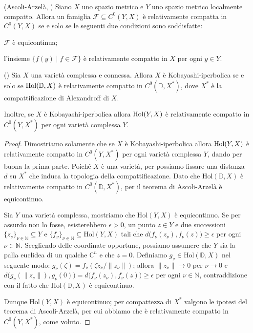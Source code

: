 \begin{thm}
    (Ascoli-Arzelà, \cite[Chapter 7, Theorem 17]{Ke}) Siano $X$ uno spazio metrico e $Y$ uno spazio metrico localmente compatto. Allora un famiglia $\mathcal{F}\subseteq C^0(Y,X)$ è relativamente compatta in $C^0(Y,X)$ se e solo se le seguenti due condizioni sono soddisfatte:
    \begin{nlist}
        \item $\mathcal{F}$ è equicontinua;
        \item l'insieme $\{f(y)\mid f\in\mathcal{F}\}$ è relativamente compatto in $X$ per ogni $y\in Y$.
    \end{nlist}
\end{thm}

\begin{prop} \label{alex}
    (\cite[Theorem 1.3]{A3}) Sia $X$ una varietà complessa e connessa. Allora $X$ è Kobayashi-iperbolica se e solo se $\textnormal{Hol}(\mathbb{D},X)$ è relativamente compatto in $C^0(\mathbb{D},X^*)$, dove $X^*$ è la compattificazione di Alexandroff di $X$.
    
    Inoltre, se $X$ è Kobayashi-iperbolica allora $\textnormal{Hol}(Y,X)$ è relativamente compatto in $C^0(Y,X^*)$ per ogni varietà complessa $Y$.
\end{prop}

\begin{proof}
    Dimostriamo solamente che se $X$ è Kobayashi-iperbolica allora $\textnormal{Hol}(Y,X)$ è relativamente compatto in $C^0(Y,X^*)$ per ogni varietà complessa $Y$, dando per buona la prima parte. Poiché $X$ è una varietà, per \cite[4.16]{Ke} possiamo fissare una distanza $d$ su $X^*$ che induca la topologia della compattificazione. Dato che $\text{Hol}(\mathbb{D},X)$ è relativamente compatto in $C^0(\mathbb{D},X^*)$, per il teorema di Ascoli-Arzelà è equicontinuo.
    
    Sia $Y$ una varietà complessa, mostriamo che $\text{Hol}(Y,X)$ è equicontinuo. Se per assurdo non lo fosse, esisterebbero $\epsilon>0$, un punto $z\in Y$ e due successioni $\{z_\nu\}_{\nu\in\mathbb{N}}\subseteq Y$ e $\{f_\nu\}_{\nu\in\mathbb{N}}\subseteq\text{Hol}(Y,X)$ tali che $d\big(f_\nu(z_\nu),f_\nu(z)\big)\ge\epsilon$ per ogni $\nu\in\mathbb{N}$. Scegliendo delle coordinate opportune, possiamo assumere che $Y$ sia la palla euclidea di un qualche $\mathbb{C}^n$ e che $z=0$. Definiamo $g_\nu\in\text{Hol}(\mathbb{D},X)$ nel seguente modo: $g_\nu(\zeta)=f_\nu(\zeta z_\nu/\|z_\nu\|)$; allora $\|z_\nu\| \longrightarrow 0$ per $\nu\longrightarrow 0$ e $d\big(g_\nu(\|z_\nu\|),g_\nu(0)\big)=d\big(f_\nu(z_\nu),f_\nu(z)\big)\ge\epsilon$ per ogni $\nu\in\mathbb{N}$, contraddizione con il fatto che $\text{Hol}(\mathbb{D},X)$ è equicontinuo.

    Dunque $\text{Hol}(Y,X)$ è equicontinuo; per compattezza di $X^*$ valgono le ipotesi del teorema di Ascoli-Arzelà, per cui abbiamo che è relativamente compatto in $C^0(Y,X^*)$, come voluto.
\end{proof}


